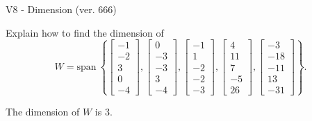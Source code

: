 \begin{exercise}
  \begin{exerciseTitle}V8 - Dimension (ver. 666)\end{exerciseTitle}
  \begin{exerciseStatement}
    Explain how to find the dimension of 
\[W=\mathrm{span}\ \left\{\left[\begin{array}{r}
-1 \\
-2 \\
3 \\
0 \\
-4
\end{array}\right] , \left[\begin{array}{r}
0 \\
-3 \\
-3 \\
3 \\
-4
\end{array}\right] , \left[\begin{array}{r}
-1 \\
1 \\
-2 \\
-2 \\
-3
\end{array}\right] , \left[\begin{array}{r}
4 \\
11 \\
7 \\
-5 \\
26
\end{array}\right] , \left[\begin{array}{r}
-3 \\
-18 \\
-11 \\
13 \\
-31
\end{array}\right]\right\}.\]



  \end{exerciseStatement}
  \begin{exerciseAnswer}
   The dimension of \(W\) is  \(3\).
  


  \end{exerciseAnswer}
\end{exercise}